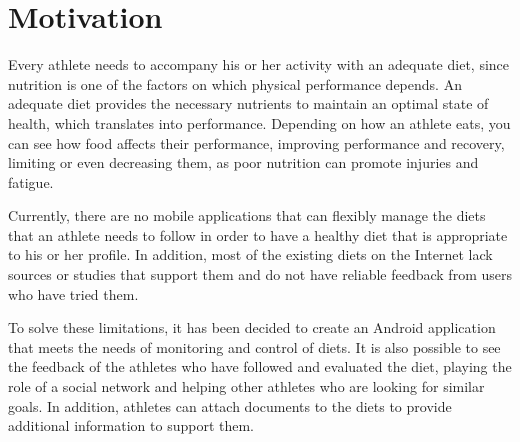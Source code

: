 \section{Motivation}



Every athlete needs to accompany his or her activity with an adequate diet, since nutrition is one of the factors on which physical performance depends. An adequate diet provides the necessary nutrients to maintain an optimal state of health, which translates into performance. Depending on how an athlete eats, you can see how food affects their performance, improving performance and recovery, limiting or even decreasing them, as poor nutrition can promote injuries and fatigue.

Currently, there are no mobile applications that can flexibly manage the diets that an athlete needs to follow in order to have a healthy diet that is appropriate to his or her profile. In addition, most of the existing diets on the Internet lack sources or studies that support them and do not have reliable feedback from users who have tried them.

To solve these limitations, it has been decided to create an Android application that meets the needs of monitoring and control of diets. It is also possible to see the feedback of the athletes who have followed and evaluated the diet, playing the role of a social network and helping other athletes who are looking for similar goals. In addition, athletes can attach documents to the diets to provide additional information to support them.